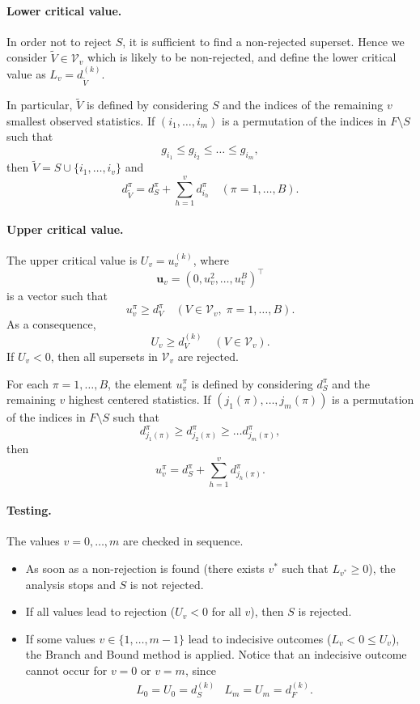 \documentclass[11pt,a4paper,openright,twoside]{article}
\begin{document}
\paragraph{Lower critical value.} In order not to reject $S$, it is sufficient to find a non-rejected superset. Hence we consider $\tilde{V}\in\mathcal{V}_v$ which is likely to be non-rejected, and define the lower critical value as $L_v=d_{\tilde{V}}^{(k)}$.

In particular, $\tilde{V}$ is defined by considering $S$ and the indices of the remaining $v$ smallest observed statistics. If $(i_1,\ldots,i_m)$ is a permutation of the indices in $F\setminus S$ such that
\[g_{i_1}\leq g_{i_2}\leq\ldots\leq g_{i_m},\]
then $\tilde{V}=S\cup \{i_1,\ldots,i_v\}$ and
\[d_{\tilde{V}}^\pi = d_S^\pi + \sum_{h=1}^v d_{i_h}^\pi\quad (\pi=1,\ldots,B).\]

\paragraph{Upper critical value.} The upper critical value is $U_v=u_v^{(k)}$, where
\[\mathbf{u}_v=(0,u_v^2,\ldots,u_v^B)^\top\]
is a vector such that
\[u_v^\pi\geq d_V^\pi\quad (V\in\mathcal{V}_v,\;\pi=1,\ldots,B).\]
As a consequence,
\[U_v \geq d_V^{(k)}\quad (V\in\mathcal{V}_v).\]
If $U_v<0$, then all supersets in $\mathcal{V}_v$ are rejected.

For each $\pi=1,\ldots,B$, the element $u_v^\pi$ is defined by considering $d_S^\pi$ and the remaining $v$ highest centered statistics. If $(j_1(\pi),\ldots,j_m(\pi))$ is a permutation of the indices in $F\setminus S$ such that
\[d_{j_1(\pi)}^\pi\geq d_{j_2(\pi)}^\pi\geq\ldots d_{j_m(\pi)}^\pi ,\]
then
\[u_v^\pi=d_S^\pi + \sum_{h=1}^v d_{j_h(\pi)}^\pi.\]




\paragraph{Testing.}
The values $v=0,\ldots, m$ are checked in sequence.
\begin{itemize}
\item As soon as a non-rejection is found (there exists $v^*$ such that $L_{v^*}\geq 0$), the analysis stops and $S$ is not rejected.
\item If all values lead to rejection ($U_v<0$ for all $v$), then $S$ is rejected.
\item If some values $v\in \{1,\ldots,m-1\}$ lead to indecisive outcomes ($L_v < 0\leq U_v$), the Branch and Bound method is applied. Notice that an indecisive outcome cannot occur for $v=0$ or $v=m$, since
\begin{align*}
& L_0=U_0=d_S^{(k)} & L_m=U_m=d_F^{(k)}.
\end{align*}
\end{itemize}
\end{document}
